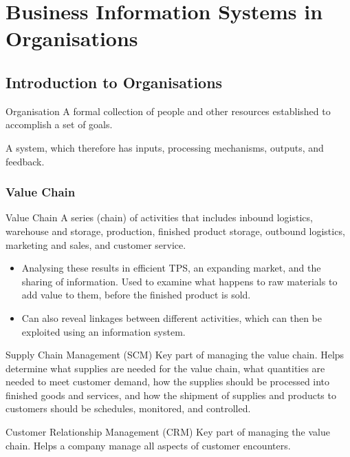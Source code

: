\documentclass[\main/notes.tex]{subfiles}
\begin{document}
	\setcounter{chapter}{1}
	\chapter{Business Information Systems in Organisations}
		\section{Introduction to Organisations}
			\begin{definition}{Organisation}
				A formal collection of people and other resources established to accomplish a set of goals.

				A system, which therefore has inputs, processing mechanisms, outputs, and feedback.
			\end{definition}
			\subsection{Value Chain}
				\begin{definition}{Value Chain}
					A series (chain) of activities that includes inbound logistics, warehouse and storage, production, finished product storage, outbound logistics, marketing and sales, and customer service.
				\end{definition}
				\begin{itemize}
					\item Analysing these results in efficient TPS, an expanding market, and the sharing of information. Used to examine what happens to raw materials to add value to them, before the finished product is sold.
					\item Can also reveal linkages between different activities, which can then be exploited using an information system.
				\end{itemize}
				\begin{definition}{Supply Chain Management (SCM)}
					Key part of managing the value chain. Helps determine what supplies are needed for the value chain, what quantities are needed to meet customer demand, how the supplies should be processed into finished goods and services, and how the shipment of supplies and products to customers should be schedules, monitored, and controlled.
				\end{definition}
				\begin{definition}{Customer Relationship Management (CRM)}
					Key part of managing the value chain. Helps a company manage all aspects of customer encounters.
				\end{definition}
\end{document}
